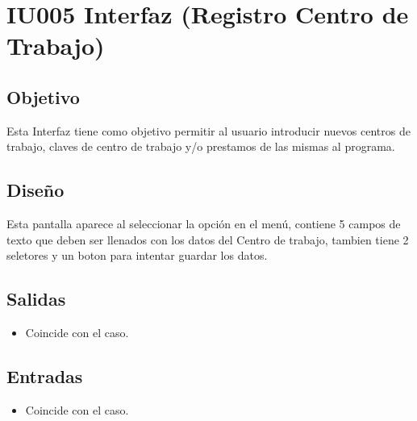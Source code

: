 \section{IU005 Interfaz (Registro Centro de Trabajo)}

\subsection{Objetivo}
 Esta Interfaz tiene como objetivo permitir al usuario introducir nuevos centros de trabajo, claves de centro de trabajo y/o prestamos de las mismas al programa.

\subsection{Diseño}
	 Esta pantalla  aparece al seleccionar la opción en el menú, contiene 5 campos de texto que deben ser llenados con los datos del Centro de trabajo, tambien tiene 2 seletores y un boton para intentar guardar los datos.
\clearpage
{}


\subsection{Salidas}


	\begin{itemize}
		\item Coincide con el caso.
	\end{itemize}
	
\subsection{Entradas}

	\begin{itemize}
		\item Coincide con el caso.
	\end{itemize}

